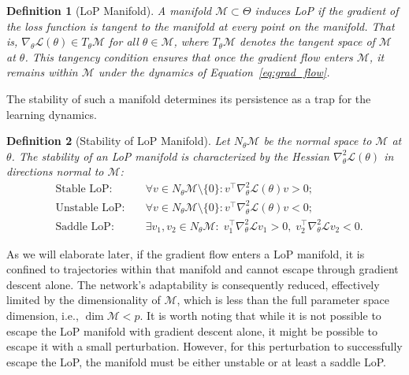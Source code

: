 \documentclass{article}
\newcommand{\Loss}{\mathcal{L}}
\newtheorem{definition}{Definition}[section]
\begin{document}
\begin{definition}[LoP Manifold]
\label{def:lop}
A manifold $\mathcal{M}\subset\Theta$ induces LoP if the gradient of the loss function is tangent to the manifold at every point on the manifold. That is, $\nabla_\theta\Loss(\theta)\in T_\theta\mathcal{M}$ for all $\theta\in\mathcal{M}$, where $T_\theta\mathcal{M}$ denotes the tangent space of $\mathcal{M}$ at $\theta$. This tangency condition ensures that once the gradient flow enters $\mathcal{M}$, it remains within $\mathcal{M}$ under the dynamics of Equation~\ref{eq:grad_flow}.
\end{definition}



The stability of such a manifold determines its persistence as a trap for the learning dynamics.
\begin{definition}[Stability of LoP Manifold]
\label{def:lop_stability}
Let $N_\theta\mathcal{M}$ be the normal space to $\mathcal{M}$ at $\theta$. The stability of an LoP manifold is characterized by the Hessian $\nabla_\theta^2\Loss(\theta)$ in directions normal to $\mathcal{M}$:
        \begin{align}
        &\text{Stable LoP:}\; &&\forall v\in N_\theta\mathcal{M}\setminus\{0\}: v^\top\nabla_\theta^2\Loss(\theta)v > 0; \label{eq:stable}\\
        &\text{Unstable LoP:}\; &&\forall v\in N_\theta\mathcal{M}\setminus\{0\}: v^\top\nabla_\theta^2\Loss(\theta)v < 0; \label{eq:unstable}\\
        &\text{Saddle LoP:}\; &&\exists v_1,v_2\in N_\theta\mathcal{M}:\; v_1^\top\nabla_\theta^2\Loss v_1>0,\; v_2^\top\nabla_\theta^2\Loss v_2<0. \label{eq:saddle}
        \end{align}
\end{definition}

As we will elaborate later, if the gradient flow enters a LoP manifold, it is confined to trajectories within that manifold and cannot escape through gradient descent alone. The network's adaptability is consequently reduced, effectively limited by the dimensionality of $\mathcal{M}$, which is  less than the full parameter space dimension, i.e., $\dim\mathcal{M} < p$. It is worth noting that while it is not possible to escape the LoP manifold with gradient descent alone, it might be possible to escape it with a small perturbation. However, for this perturbation to successfully escape the LoP, the manifold must be either unstable or at least a saddle LoP.
\end{document}
